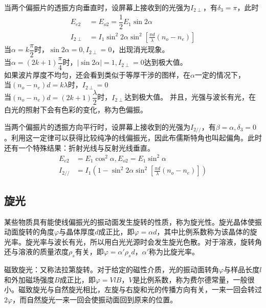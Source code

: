 当两个偏振片的透振方向垂直时，设屏幕上接收到的光强为$I_{2\perp}$，有$\delta _3 = \pi$，此时
\begin{align}
    E_{e2}&=E_{o2}=\dfrac{1}{2}E_1\sin 2\alpha\\
    I_{2\perp}&=I_1 \sin^2 2\alpha \sin ^2 [\frac{\pi d }{\lambda}(n_o-n_e)]
\end{align}
当$\alpha=k\dfrac{\pi}{2}$时，$\sin 2\alpha=0,I_{2\perp}=0$，出现消光现象。\\
当$\alpha=(2k+1)\dfrac{\pi}{4}$时，$|\sin 2\alpha|=1,$$I_{2\perp}=0$达到极大值。\\
如果波片厚度不均匀，还会看到类似于等厚干涉的图样，在$\alpha$一定的情况下，\\
当$(n_o-n_e)d=k\lambda$时，$I_{2\perp}=0$\\
当$(n_o-n_e)d=(2k+1)\dfrac{\lambda}{2}$时，$I_{2\perp}$达到极大值。
并且，光强与波长有光，在白光的照射下会有色彩的变化，称为色偏振。

当两个偏振片的透振方向平行时，设屏幕上接收到的光强为$I_{2//}$，有$\beta = \alpha,\delta _3 = 0$。利用这一定律可以获得比较纯净的线偏振光，因此布儒斯特角也叫起偏角。此时还有一个特殊结果：折射光线与反射光线垂直。
\begin{align}
    E_{e2}&=E_1 \cos^2 \alpha, E_{o2}=E_1 \sin^2 \alpha\\
    I_{2//}&=I_1(1-\sin ^2 2\alpha \sin ^2 [\frac{\pi d }{\lambda}(n_o-n_e)])
\end{align}
\subsection{旋光}
某些物质具有能使线偏振光的振动面发生旋转的性质，称为旋光性。旋光晶体使振动面旋转的角度$\varphi$与晶体厚度$d$成正比，即$\varphi = \alpha d$，其中比例系数称为该晶体的旋光率。旋光率与波长有光，所以用白光光源时会发生旋光色散。对于溶液，旋转角还与溶液的质量浓度$\rho_s$有关，即$\varphi = \alpha' \rho_s d$，$\alpha'$称为比旋光率。

磁致旋光：又称法拉第旋转。对于给定的磁性介质，光的振动面转角$\varphi$与样品长度$l$和外加磁场强度$B$成正比，即$\varphi = V l B$，$V$是比例系数，称为费尔德常量，一般很小。磁致旋光与自然旋光相比，左旋与右旋和光的传播方向有关，一来一回会转过$2\varphi$，而自然旋光一来一回会使振动面回到原来的位置。